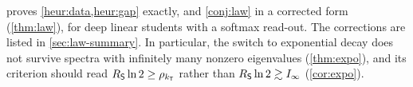 \begin{remark}[Status]\label{rem:conj-status}
 proves \cref{heur:data,heur:gap} exactly, and \cref{conj:law} in a corrected form (\cref{thm:law}),
for deep linear students with a softmax read-out. The corrections are listed in \cref{sec:law-summary}. In
particular, the switch to exponential decay does not survive spectra with infinitely many nonzero
eigenvalues (\cref{thm:expo}), and its criterion should read $R_{\mathsf{S}}\ln2\ge\rho_{k_{\mathsf{T}}}$ rather than $R_{\mathsf{S}}\ln2\gtrsim I_\infty$
(\cref{cor:expo}).
\end{remark}
